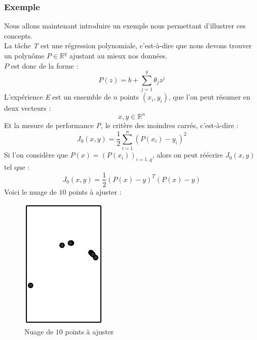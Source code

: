 \documentclass[10pt,a4paper]{report}
\begin{document}
			\subsubsection{Exemple}
			Nous allons maintenant introduire un exemple nous permettant d'illustrer ces concepts.\\
			La tâche \emph{T} est une régression polynomiale, c'est-à-dire que nous devons trouver un polynôme $P \in \mathbb{R}^{q}$ ajustant au mieux nos données.\\
			$P$ est donc de la forme :
			$$P(z) = b + \sum_{j=1}^{q}{\theta_j z^j}$$
			L'expérience \emph{E} est un ensemble de $n$ points $(x_i,y_i)$, que l'on peut résumer en deux vecteurs :
			$$x, y \in \mathbb{R}^n$$
			Et la mesure de performance \emph{P}, le critère des moindres carrés, c'est-à-dire :
			$$J_0(x,y) =\frac{1}{2} \sum_{i=1}^{n}{(P(x_i)-y_i)^2}$$
			Si l'on considère que $P(x) = (P(x_i))_{i=1..q}$, alors on peut réécrire $J_0(x,y)$ tel que :
			$$J_0(x,y) = \frac{1}{2} (P(x)-y)^T(P(x)-y)$$
			Voici le nuage de $10$ points à ajuster :
			\begin{figure}[H]
				\begin{center}
					\includegraphics[scale=0.5]{Images/fittingproblem.png}
					\caption{Nuage de $10$ points à ajuster}		
				\end{center}
			\end{figure}
			
\end{document}
